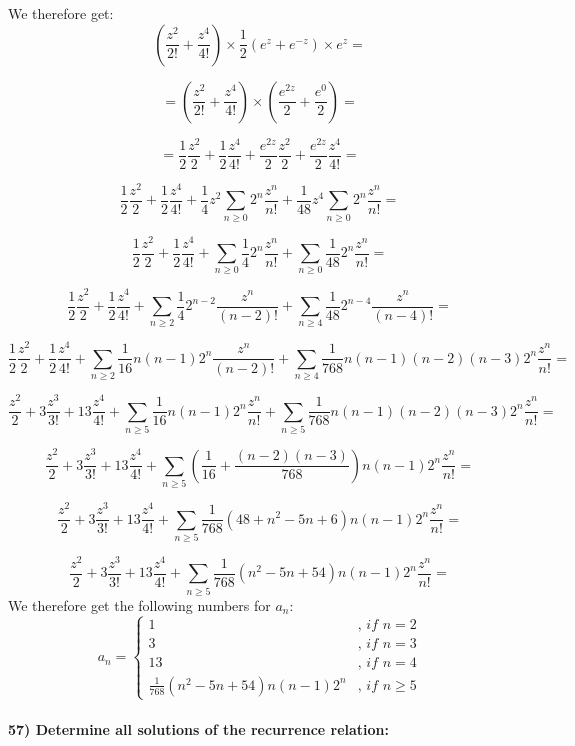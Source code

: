 \documentclass[
]{article}
\begin{document}
We therefore get: \[
(\frac{z^2}{2!} + \frac{z^4}{4!}) \times \frac{1}{2}(e^z + e^{-z}) \times e^z = 
\]

\[
= (\frac{z^2}{2!} + \frac{z^4}{4!}) \times (\frac{e^{2z}}{2} + \frac{e^{0}}{2})= 
\]

\[
= \frac{1}{2} \frac{z^2}{2} + \frac{1}{2} \frac{z^4}{4!} + \frac{e^{2z}}{2} \frac{z^2}{2} + \frac{e^{2z}} {2}\frac{z^4}{4!} = 
\]

\[
\frac{1}{2} \frac{z^2}{2} + \frac{1}{2} \frac{z^4}{4!} + \frac{1}{4} z ^2 \sum_{n \geq 0} 2^n \frac{z^{n}}{n!} + 
\frac{1}{48} z ^4 \sum_{n \geq 0} 2^n \frac{z^{n}}{n!} = 
\]

\[
\frac{1}{2} \frac{z^2}{2} + \frac{1}{2} \frac{z^4}{4!} + \sum_{n \geq 0} \frac{1}{4}  2^n \frac{z^{n}}{n!} + 
\sum_{n \geq 0} \frac{1}{48}  2^{n} \frac{z^{n}}{n!} = 
\]

\[
\frac{1}{2} \frac{z^2}{2} + \frac{1}{2} \frac{z^4}{4!} + \sum_{n \geq 2} \frac{1}{4}  2^{n-2} \frac{z^{n}}{(n-2)!} + 
\sum_{n \geq 4} \frac{1}{48} 2^{n-4} \frac{z^{n}}{(n-4)!} = 
\]

\[
\frac{1}{2} \frac{z^2}{2} + \frac{1}{2} \frac{z^4}{4!} + \sum_{n \geq 2} \frac{1}{16} n (n-1) 2^n \frac{z^n}{(n-2)!} + 
\sum_{n \geq 4} \frac{1}{768} n (n-1)(n-2) (n-3) 2^n \frac{z^n}{n!} = 
\]

\[
\frac{z^2}{2} + 3 \frac{z^3}{3!} + 13 \frac{z^4}{4!} + \sum_{n \geq 5} \frac{1}{16} n (n-1) 2^n \frac{z^n}{n!} + 
\sum_{n \geq 5} \frac{1}{768} n (n-1) (n-2) (n-3) 2^n \frac{z^n}{n!} = 
\]

\[
\frac{z^2}{2} + 3 \frac{z^3}{3!} + 13 \frac{z^4}{4!} + \sum_{n \geq 5} (\frac{1}{16} + \frac{(n-2)(n-3)}{768}) n (n-1) 2^n \frac{z^n}{n!} = 
\]

\[
\frac{z^2}{2} + 3 \frac{z^3}{3!} + 13 \frac{z^4}{4!} + \sum_{n \geq 5} \frac{1}{768} (48 + n^2 - 5n + 6) n (n-1) 2^n \frac{z^n}{n!} = 
\]

\[
\frac{z^2}{2} + 3 \frac{z^3}{3!} + 13 \frac{z^4}{4!} + \sum_{n \geq 5} \frac{1}{768} (n^2 - 5n + 54) n (n-1) 2^n \frac{z^n}{n!} = 
\] We therefore get the following numbers for \(a_n\): \[
a_n = \begin{cases}
1  &\textit{, if } n = 2 \\
3  &\textit{, if } n = 3 \\
13  &\textit{, if } n = 4 \\
\frac{1}{768} (n^2 - 5n + 54) n (n-1) 2^n  &\textit{, if } n \geq 5 
\end{cases}
\]

\hypertarget{determine-all-solutions-of-the-recurrence-relation}{%
\paragraph{57) Determine all solutions of the recurrence
relation:}\label{determine-all-solutions-of-the-recurrence-relation}}
\end{document}
